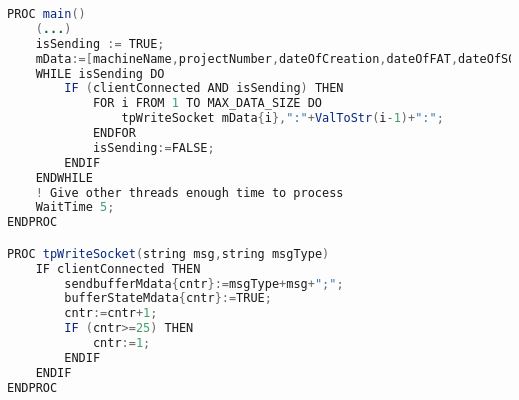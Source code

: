 \label{app:MachineData}
\begin{lstlisting}[language=Java, caption=Task MachineData - Modul 
MachineData]
PROC main()
	(...)
	isSending := TRUE;
	mData:=[machineName,projectNumber,dateOfCreation,dateOfFAT,dateOfSOP,serial,version,rtype,cid,lanip,clang,dutyTime];
    WHILE isSending DO
	    IF (clientConnected AND isSending) THEN					
	        FOR i FROM 1 TO MAX_DATA_SIZE DO
	            tpWriteSocket mData{i},":"+ValToStr(i-1)+":";
            ENDFOR                 
			isSending:=FALSE;				
        ENDIF
    ENDWHILE
	! Give other threads enough time to process
	WaitTime 5;
ENDPROC

PROC tpWriteSocket(string msg,string msgType)
	IF clientConnected THEN
		sendbufferMdata{cntr}:=msgType+msg+";";
		bufferStateMdata{cntr}:=TRUE;	
		cntr:=cntr+1;
		IF (cntr>=25) THEN
			cntr:=1;
        ENDIF
	ENDIF
ENDPROC	
\end{lstlisting}